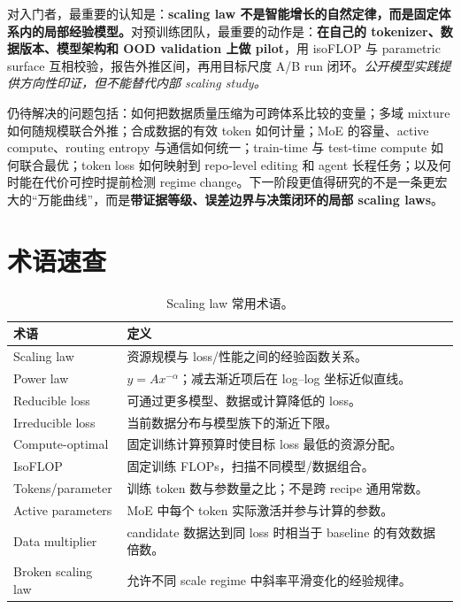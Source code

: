 \documentclass[UTF8,10pt,a4paper,fontset=none]{ctexart}
\newcommand{\term}[1]{\textbf{#1}}
\begin{document}
对入门者，最重要的认知是：\textbf{scaling law 不是智能增长的自然定律，而是固定体系内的局部经验模型。}对预训练团队，最重要的动作是：\textbf{在自己的 tokenizer、数据版本、模型架构和 OOD validation 上做 pilot}，用 isoFLOP 与 parametric surface 互相校验，报告外推区间，再用目标尺度 A/B run 闭环。\textit{公开模型实践提供方向性印证，但不能替代内部 scaling study。}

仍待解决的问题包括：如何把数据质量压缩为可跨体系比较的变量；多域 mixture 如何随规模联合外推；合成数据的有效 token 如何计量；MoE 的容量、active compute、routing entropy 与通信如何统一；train-time 与 test-time compute 如何联合最优；token loss 如何映射到 repo-level editing 和 agent 长程任务；以及何时能在代价可控时提前检测 regime change。下一阶段更值得研究的不是一条更宏大的“万能曲线”，而是\term{带证据等级、误差边界与决策闭环的局部 scaling laws}。

\appendix
\clearpage
\section{术语速查}
\label{app:glossary}

\begin{table}[htbp]
\centering
\caption{Scaling law 常用术语。}\label{tab:glossary}
\begin{tabularx}{\textwidth}{p{3.6cm}X}
\toprule
术语 & 定义 \\
\midrule
Scaling law & 资源规模与 loss/性能之间的经验函数关系。 \\
Power law & $y=A x^{-\alpha}$；减去渐近项后在 log--log 坐标近似直线。 \\
Reducible loss & 可通过更多模型、数据或计算降低的 loss。 \\
Irreducible loss & 当前数据分布与模型族下的渐近下限。 \\
Compute-optimal & 固定训练计算预算时使目标 loss 最低的资源分配。 \\
IsoFLOP & 固定训练 FLOPs，扫描不同模型/数据组合。 \\
Tokens/parameter & 训练 token 数与参数量之比；不是跨 recipe 通用常数。 \\
Active parameters & MoE 中每个 token 实际激活并参与计算的参数。 \\
Data multiplier & candidate 数据达到同 loss 时相当于 baseline 的有效数据倍数。 \\
Broken scaling law & 允许不同 scale regime 中斜率平滑变化的经验规律。 \\
\bottomrule
\end{tabularx}
\end{table}
\end{document}
